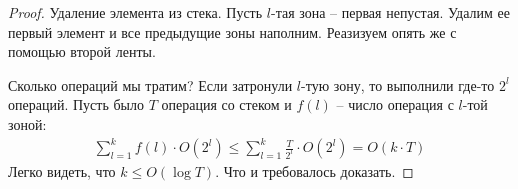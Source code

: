 \begin{proof}
    Удаление элемента из стека. Пусть $l$-тая зона -- первая непустая. Удалим ее первый элемент и все предыдущие зоны наполним. Реазизуем опять же с помощью второй ленты.
 
    Сколько операций мы тратим? Если затронули $l$-тую зону, то выполнили где-то $2^l$ операций. Пусть было $T$ операция со стеком и $f(l)$ -- число операция с $l$-той зоной: \begin{gather*}
        \sum_{l = 1}^k f(l) \cdot O(2^l) \leqslant \sum_{l = 1}^k \frac{T}{2^l} \cdot O(2^l) = O(k \cdot T) 
    \end{gather*}
    Легко видеть, что $k \leqslant O(\log T)$. Что и требовалось доказать.
 
\end{proof}